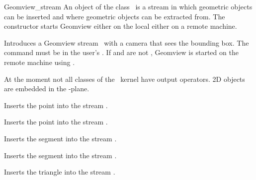 \begin{ccClass}{Geomview_stream}
\ccDefinition
An object of the class \ccClassName\ is a stream in which geometric
objects can be inserted and where geometric objects can be extracted
from. The constructor starts Geomview either on the local either on
a remote machine.


\ccThreeToTwo
\ccCreation
{}

{Introduces a Geomview stream \ccVar\ with a camera that sees the
bounding box.  The command  must be in the user's .
If  and  are not ,
Geomview is started on the remote machine using .}

\ccOperations



\def\ccTagRmEigenClassName{\ccFalse}

At the moment not all classes of the \cgal\ kernel have output
operators. 2D objects are embedded in the -plane.

{Inserts the point  into the stream \ccVar.}

\newpage
{}
{Inserts the point  into the stream \ccVar.}


{Inserts the segment  into the stream \ccVar.}

{Inserts the segment  into the stream \ccVar.}


{Inserts the triangle  into the stream \ccVar.}



\end{ccClass}
